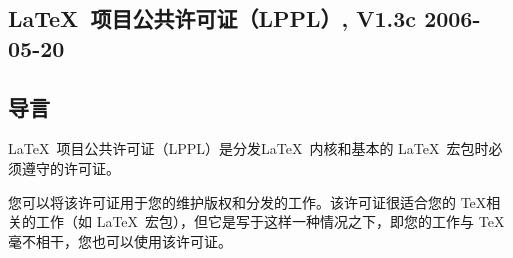 \begin{LPPLicense}
    \providecommand{\LPPLsection}{\section*}
    \providecommand{\LPPLsubsection}{\subsection*}
    \providecommand{\LPPLsubsubsection}{\subsubsection*}
    \providecommand{\LPPLparagraph}{\paragraph*}
    \providecommand*{\LPPLfile}[1]{\texttt{#1}}
    \providecommand*{\LPPLdocfile}[1]{`\LPPLfile{#1.tex}'}
    \providecommand*{\LPPL}{\textsc{lppl}}

    \LPPLsection{\LaTeX\ 项目公共许可证（LPPL）, V1.3c 2006-05-20}
    \label{LPPL:LPPL}


    \LPPLsubsection{导言}
    \label{LPPL:Preamble}


    \LaTeX\ 项目公共许可证（LPPL）是分发\LaTeX\ 内核和基本的 \LaTeX\ 宏包时必须遵守的许可证。


    您可以将该许可证用于您的维护版权和分发的工作。该许可证很适合您的 \TeX 相关的工作（如 \LaTeX\  宏包），但它是写于这样一种情况之下，即您的工作与 \TeX 毫不相干，您也可以使用该许可证。


\end{LPPLicense}
